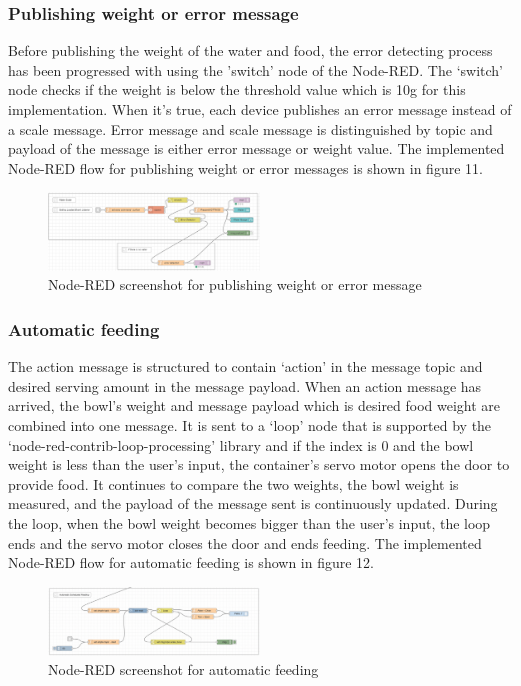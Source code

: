 \documentclass[conference]{IEEEtran}
\begin{document}
\subsubsection{Publishing weight or error message}
Before publishing the weight of the water and food, the error detecting process has been progressed with using the ’switch’ node of the Node-RED. The ‘switch’ node checks if the weight is below the threshold value which is 10g for this implementation. When it’s true, each device publishes an error message instead of a scale message. Error message and scale message is distinguished by topic and payload of the message is either error message or weight value. The implemented Node-RED flow for publishing weight or error messages is shown in figure 11.

\begin{figure}[htbp]
\centerline{\includegraphics[width=0.5\textwidth]{./images/Water Supplier Error Detection.png}}
\caption{Node-RED screenshot for publishing weight or error message}
\label{fig}
\end{figure}

\subsubsection{Automatic feeding}
The action message is structured to contain ‘action’ in the message topic and desired serving amount in the message payload. When an action message has arrived, the bowl’s weight and message payload which is desired food weight are combined into one message. It is sent to a ‘loop’ node that is supported by the ‘node-red-contrib-loop-processing’ library and if the index is 0 and the bowl weight is less than the user’s input, the container’s servo motor opens the door to provide food. It continues to compare the two weights, the bowl weight is measured, and the payload of the message sent is continuously updated. During the loop, when the bowl weight becomes bigger than the user’s input, the loop ends and the servo motor closes the door and ends feeding. The implemented Node-RED flow for automatic feeding is shown in figure 12.

\begin{figure}[htbp]
\centerline{\includegraphics[width=0.5\textwidth]{./images/automaticFeeding.png}}
\caption{Node-RED screenshot for automatic feeding}
\label{fig}
\end{figure}
\end{document}
